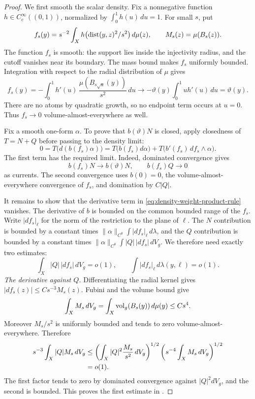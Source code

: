 \begin{proof}
We first smooth the scalar density.  Fix a nonnegative function
\(h\in C_c^\infty((0,1))\), normalized by
\(\int_0^1h(u)\,du=1\).  For small \(s\), put
\begin{equation}\label{eq:density-smoothed}
 f_s(y)=s^{-2}\int_X
          h\bigl(\operatorname{dist}(y,z)^2/s^2\bigr)\,d\mu(z),
 \qquad M_s(z)=\mu(B_s(z)).
\end{equation}
The function \(f_s\) is smooth: the support lies inside the injectivity
radius, and the cutoff vanishes near its boundary.  The mass bound
makes \(f_s\) uniformly bounded.  Integration with respect to the
radial distribution of \(\mu\) gives
\[
 f_s(y)=-\int_0^1 h'(u)\,
             \frac{\mu(B_{s\sqrt u}(y))}{s^2}\,du
 \longrightarrow
 -\vartheta(y)\int_0^1u h'(u)\,du=\vartheta(y).
\]
There are no atoms by quadratic growth, so no endpoint term occurs
at \(u=0\).  Thus \(f_s\to0\) volume-almost-everywhere as well.

Fix a smooth one-form \(\alpha\). To prove that \(b(\vartheta)N\)
is closed, apply closedness of \(T=N+Q\) before passing to the
density limit:
\begin{equation}\label{eq:density-weight-product-rule}
 0=T\bigl(d(b(f_s)\alpha)\bigr)
   =T\bigl(b(f_s)d\alpha\bigr)
    +T\bigl(b'(f_s)\,df_s\wedge\alpha\bigr).
\end{equation}
The first term has the required limit. Indeed, dominated convergence
gives
\[
 b(f_s)N\longrightarrow b(\vartheta)N,\qquad
 b(f_s)Q\longrightarrow0
\]
as currents. The second convergence uses \(b(0)=0\), the
volume-almost-everywhere convergence of \(f_s\), and domination
by \(C|Q|\).

It remains to show that the derivative term in
\eqref{eq:density-weight-product-rule} vanishes. The derivative of
\(b\) is bounded on the common bounded range of the \(f_s\).
Write \(|df_s|_\ell\) for the norm of the restriction to the plane
of \(\ell\). The \(N\) contribution is bounded by a constant times
\(\|\alpha\|_{C^0}\int |df_s|_\ell\,d\lambda\), and the \(Q\)
contribution is bounded by a constant times
\(\|\alpha\|_{C^0}\int |Q|\,|df_s|\,dV_g\).
We therefore need exactly two estimates:
\begin{equation}\label{eq:density-two-gradient-estimates}
 \int_X |Q|\,|df_s|\,dV_g=o(1),
 \qquad
 \int |df_s|_\ell\,d\lambda(y,\ell)=o(1).
\end{equation}
\smallskip
\noindent\emph{The derivative against \(Q\).}
Differentiating the radial kernel gives
\(|df_s(z)|\le Cs^{-3}M_s(z)\).  Fubini and the volume bound give
\[
 \int_X M_s\,dV_g
 =\int_X\operatorname{vol}_g(B_s(y))\,d\mu(y)\le Cs^4.
\]
Moreover \(M_s/s^2\) is uniformly bounded and tends to zero
volume-almost-everywhere.  Therefore
\begin{align}
 s^{-3}\int_X |Q|M_s\,dV_g
 &\le
 \left(\int_X |Q|^2\frac{M_s}{s^2}\,dV_g\right)^{1/2}
 \left(s^{-4}\int_X M_s\,dV_g\right)^{1/2}\notag\\
 &=o(1).
 \label{eq:density-q-gradient}
\end{align}
The first factor tends to zero by dominated convergence against
\(|Q|^2dV_g\), and the second is bounded.  This proves the first
estimate in .


\end{proof}

